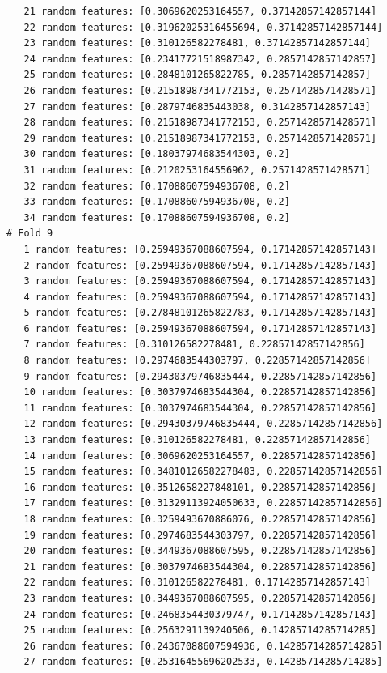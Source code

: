 \documentclass[12pt]{amsart}
\begin{document}
\begin{verbatim}
   21 random features: [0.3069620253164557, 0.37142857142857144]
   22 random features: [0.31962025316455694, 0.37142857142857144]
   23 random features: [0.310126582278481, 0.37142857142857144]
   24 random features: [0.23417721518987342, 0.2857142857142857]
   25 random features: [0.2848101265822785, 0.2857142857142857]
   26 random features: [0.21518987341772153, 0.2571428571428571]
   27 random features: [0.2879746835443038, 0.3142857142857143]
   28 random features: [0.21518987341772153, 0.2571428571428571]
   29 random features: [0.21518987341772153, 0.2571428571428571]
   30 random features: [0.18037974683544303, 0.2]
   31 random features: [0.2120253164556962, 0.2571428571428571]
   32 random features: [0.17088607594936708, 0.2]
   33 random features: [0.17088607594936708, 0.2]
   34 random features: [0.17088607594936708, 0.2]
# Fold 9
   1 random features: [0.25949367088607594, 0.17142857142857143]
   2 random features: [0.25949367088607594, 0.17142857142857143]
   3 random features: [0.25949367088607594, 0.17142857142857143]
   4 random features: [0.25949367088607594, 0.17142857142857143]
   5 random features: [0.27848101265822783, 0.17142857142857143]
   6 random features: [0.25949367088607594, 0.17142857142857143]
   7 random features: [0.310126582278481, 0.22857142857142856]
   8 random features: [0.2974683544303797, 0.22857142857142856]
   9 random features: [0.29430379746835444, 0.22857142857142856]
   10 random features: [0.3037974683544304, 0.22857142857142856]
   11 random features: [0.3037974683544304, 0.22857142857142856]
   12 random features: [0.29430379746835444, 0.22857142857142856]
   13 random features: [0.310126582278481, 0.22857142857142856]
   14 random features: [0.3069620253164557, 0.22857142857142856]
   15 random features: [0.34810126582278483, 0.22857142857142856]
   16 random features: [0.3512658227848101, 0.22857142857142856]
   17 random features: [0.31329113924050633, 0.22857142857142856]
   18 random features: [0.3259493670886076, 0.22857142857142856]
   19 random features: [0.2974683544303797, 0.22857142857142856]
   20 random features: [0.3449367088607595, 0.22857142857142856]
   21 random features: [0.3037974683544304, 0.22857142857142856]
   22 random features: [0.310126582278481, 0.17142857142857143]
   23 random features: [0.3449367088607595, 0.22857142857142856]
   24 random features: [0.2468354430379747, 0.17142857142857143]
   25 random features: [0.2563291139240506, 0.14285714285714285]
   26 random features: [0.24367088607594936, 0.14285714285714285]
   27 random features: [0.25316455696202533, 0.14285714285714285]

\end{verbatim}
\end{document}
